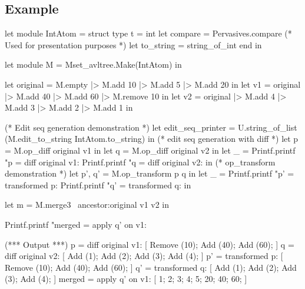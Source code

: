 \documentclass{article}
\begin{document}
\subsection{Example}\label{set-example}
\begin{longlisting}
let module IntAtom = struct
  type t = int
  let compare = Pervasives.compare
  (* Used for presentation purposes *)
  let to_string = string_of_int
end in

let module M =  Mset_avltree.Make(IntAtom) in

let original = M.empty |> M.add 10 |> M.add 5 |> M.add 20 in
let v1 = original |> M.add 40 |> M.add 60 |> M.remove 10 in
let v2 = original |> M.add 4 |> M.add 3 |> M.add 2 |> M.add 1 in

(* Edit seq generation demonstration *)
let edit_seq_printer = U.string_of_list (M.edit_to_string IntAtom.to_string) in
(* edit seq generation with diff *)
let p = M.op_diff original v1 in
let q = M.op_diff original v2 in
let _ = 
  Printf.printf "p = diff original v1: %
  Printf.printf "q = diff original v2: %
in
  (* op_transform demonstration *)
  let p', q' = M.op_transform p q in
  let _ = 
    Printf.printf "p' = transformed p: %
    Printf.printf "q' = transformed q: %
  in

let m = M.merge3 ~ancestor:original v1 v2 in

Printf.printf "merged = apply q' on v1: %

(*** Output ***)
p = diff original v1: [ Remove (10); Add (40); Add (60); ]
q = diff original v2: [ Add (1); Add (2); Add (3); Add (4); ]
p' = transformed p: [ Remove (10); Add (40); Add (60); ]
q' = transformed q: [ Add (1); Add (2); Add (3); Add (4); ]
merged = apply q' on v1: [ 1; 2; 3; 4; 5; 20; 40; 60; ]
\end{longlisting}
\end{document}
